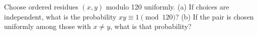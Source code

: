 Choose ordered residues $(x,y)$ modulo 120 uniformly. (a) If choices are independent, what is the probability $xy\equiv1\pmod{120}$? (b) If the pair is chosen uniformly among those with $x\ne y$, what is that probability?
